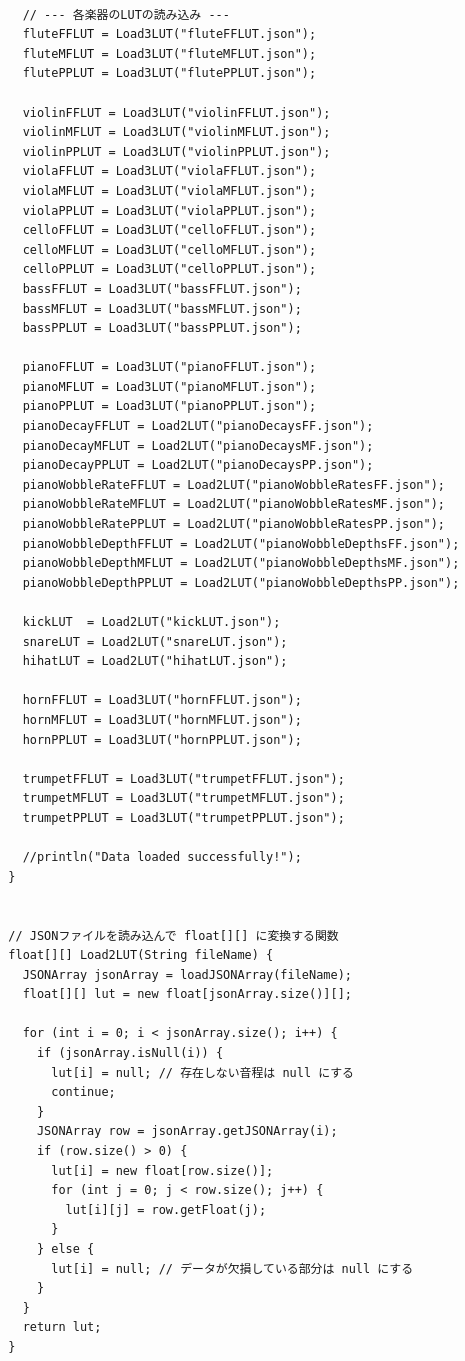 \begin{lstlisting}[caption={Utils.pde}, label={lst:proc_utils}]
    
    // --- 各楽器のLUTの読み込み ---
    fluteFFLUT = Load3LUT("fluteFFLUT.json");
    fluteMFLUT = Load3LUT("fluteMFLUT.json");
    flutePPLUT = Load3LUT("flutePPLUT.json");
    
    violinFFLUT = Load3LUT("violinFFLUT.json");
    violinMFLUT = Load3LUT("violinMFLUT.json");
    violinPPLUT = Load3LUT("violinPPLUT.json");
    violaFFLUT = Load3LUT("violaFFLUT.json");
    violaMFLUT = Load3LUT("violaMFLUT.json");
    violaPPLUT = Load3LUT("violaPPLUT.json");
    celloFFLUT = Load3LUT("celloFFLUT.json");
    celloMFLUT = Load3LUT("celloMFLUT.json");
    celloPPLUT = Load3LUT("celloPPLUT.json");
    bassFFLUT = Load3LUT("bassFFLUT.json");
    bassMFLUT = Load3LUT("bassMFLUT.json");
    bassPPLUT = Load3LUT("bassPPLUT.json");
    
    pianoFFLUT = Load3LUT("pianoFFLUT.json");
    pianoMFLUT = Load3LUT("pianoMFLUT.json");
    pianoPPLUT = Load3LUT("pianoPPLUT.json");
    pianoDecayFFLUT = Load2LUT("pianoDecaysFF.json");
    pianoDecayMFLUT = Load2LUT("pianoDecaysMF.json");
    pianoDecayPPLUT = Load2LUT("pianoDecaysPP.json");
    pianoWobbleRateFFLUT = Load2LUT("pianoWobbleRatesFF.json");
    pianoWobbleRateMFLUT = Load2LUT("pianoWobbleRatesMF.json");
    pianoWobbleRatePPLUT = Load2LUT("pianoWobbleRatesPP.json");
    pianoWobbleDepthFFLUT = Load2LUT("pianoWobbleDepthsFF.json");
    pianoWobbleDepthMFLUT = Load2LUT("pianoWobbleDepthsMF.json");
    pianoWobbleDepthPPLUT = Load2LUT("pianoWobbleDepthsPP.json");
    
    kickLUT  = Load2LUT("kickLUT.json");
    snareLUT = Load2LUT("snareLUT.json");
    hihatLUT = Load2LUT("hihatLUT.json");
    
    hornFFLUT = Load3LUT("hornFFLUT.json");
    hornMFLUT = Load3LUT("hornMFLUT.json");
    hornPPLUT = Load3LUT("hornPPLUT.json");
    
    trumpetFFLUT = Load3LUT("trumpetFFLUT.json");
    trumpetMFLUT = Load3LUT("trumpetMFLUT.json");
    trumpetPPLUT = Load3LUT("trumpetPPLUT.json");
    
    //println("Data loaded successfully!");
  }
  
  
  // JSONファイルを読み込んで float[][] に変換する関数
  float[][] Load2LUT(String fileName) {
    JSONArray jsonArray = loadJSONArray(fileName);
    float[][] lut = new float[jsonArray.size()][];
    
    for (int i = 0; i < jsonArray.size(); i++) {
      if (jsonArray.isNull(i)) {
        lut[i] = null; // 存在しない音程は null にする
        continue;
      }
      JSONArray row = jsonArray.getJSONArray(i);
      if (row.size() > 0) {
        lut[i] = new float[row.size()];
        for (int j = 0; j < row.size(); j++) {
          lut[i][j] = row.getFloat(j);
        }
      } else {
        lut[i] = null; // データが欠損している部分は null にする
      }
    }
    return lut;
  }
  

\end{lstlisting}
